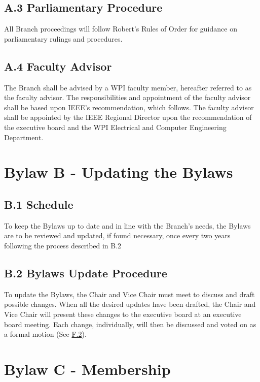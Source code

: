 \documentclass[11pt,a4paper]{article}
\begin{document}
\subsection*{A.3 Parliamentary Procedure}
All Branch proceedings will follow Robert's Rules of Order for guidance on parliamentary rulings and procedures.

\subsection*{A.4 Faculty Advisor}
The Branch shall be advised by a WPI faculty member, hereafter referred to as the faculty advisor. The responsibilities and appointment of the faculty advisor shall be based upon IEEE's recommendation, which follows. The faculty advisor shall be appointed by the IEEE Regional Director upon the recommendation of the executive board and the WPI Electrical and Computer Engineering Department.

\section*{Bylaw B - Updating the Bylaws}

\subsection*{B.1 Schedule}
To keep the Bylaws up to date and in line with the Branch's needs, the Bylaws are to be reviewed and updated, if found necessary, once every two years following the process described in B.2

\subsection*{B.2 Bylaws Update Procedure}
To update the Bylaws, the Chair and Vice Chair must meet to discuss and draft possible changes. When all the desired updates have been drafted, the Chair and Vice Chair will present these changes to the executive board at an executive board meeting. Each change, individually, will then be discussed and voted on as a formal motion (See \hyperref[F.2]{F.2}).

\section*{Bylaw C - Membership}
\end{document}
